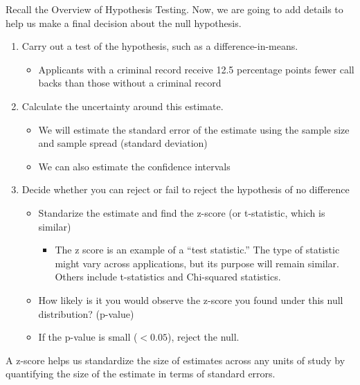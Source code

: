 \documentclass[
  letterpaper,
  DIV=11,
  numbers=noendperiod]{scrreprt}
\providecommand{\tightlist}{%
  \setlength{\itemsep}{0pt}\setlength{\parskip}{0pt}}\usepackage{longtable,booktabs,array}
\begin{document}
Recall the Overview of Hypothesis Testing. Now, we are going to add
details to help us make a final decision about the null hypothesis.

\begin{enumerate}
\def\labelenumi{\arabic{enumi}.}
\setcounter{enumi}{3}
\tightlist
\item
  Carry out a test of the hypothesis, such as a difference-in-means.

  \begin{itemize}
  \tightlist
  \item
    Applicants with a criminal record receive 12.5 percentage points
    fewer call backs than those without a criminal record
  \end{itemize}
\item
  Calculate the uncertainty around this estimate.

  \begin{itemize}
  \tightlist
  \item
    We will estimate the standard error of the estimate using the sample
    size and sample spread (standard deviation)
  \item
    We can also estimate the confidence intervals
  \end{itemize}
\item
  Decide whether you can reject or fail to reject the hypothesis of no
  difference

  \begin{itemize}
  \tightlist
  \item
    Standarize the estimate and find the z-score (or t-statistic, which
    is similar)

    \begin{itemize}
    \tightlist
    \item
      The z score is an example of a ``test statistic.'' The type of
      statistic might vary across applications, but its purpose will
      remain similar. Others include t-statistics and Chi-squared
      statistics.
    \end{itemize}
  \item
    How likely is it you would observe the z-score you found under this
    null distribution? (p-value)
  \item
    If the p-value is small (\(< 0.05\)), reject the null.
  \end{itemize}
\end{enumerate}

A z-score helps us standardize the size of estimates across any units of
study by quantifying the size of the estimate in terms of standard
errors.
\end{document}
